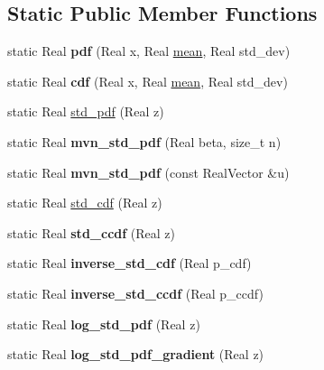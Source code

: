 \subsection*{Static Public Member Functions}
\begin{DoxyCompactItemize}
\item 
static Real {\bfseries pdf} (Real x, Real \hyperlink{classPecos_1_1NormalRandomVariable_a962ffe5a3593be370d5c883365c060f4}{mean}, Real std\+\_\+dev)\label{classPecos_1_1NormalRandomVariable_a1c24d3db932d840bd8876d25445fe0d2}

\item 
static Real {\bfseries cdf} (Real x, Real \hyperlink{classPecos_1_1NormalRandomVariable_a962ffe5a3593be370d5c883365c060f4}{mean}, Real std\+\_\+dev)\label{classPecos_1_1NormalRandomVariable_a997b966ecf3b793457430273db5079e3}

\item 
static Real \hyperlink{classPecos_1_1NormalRandomVariable_a1723ee7569b2b6dd6413dc9ffc0382b6}{std\+\_\+pdf} (Real z)
\item 
static Real {\bfseries mvn\+\_\+std\+\_\+pdf} (Real beta, size\+\_\+t n)\label{classPecos_1_1NormalRandomVariable_aa8b5e5701c2456b953f1c386d36e07fe}

\item 
static Real {\bfseries mvn\+\_\+std\+\_\+pdf} (const Real\+Vector \&u)\label{classPecos_1_1NormalRandomVariable_a12503add3b2cec672b8c9b50c13bf4cc}

\item 
static Real \hyperlink{classPecos_1_1NormalRandomVariable_a62b98da8336394c9e30ea9fd5e79b2e5}{std\+\_\+cdf} (Real z)
\item 
static Real {\bfseries std\+\_\+ccdf} (Real z)\label{classPecos_1_1NormalRandomVariable_aa02b173cdbee0e135e5501acc7edd639}

\item 
static Real {\bfseries inverse\+\_\+std\+\_\+cdf} (Real p\+\_\+cdf)\label{classPecos_1_1NormalRandomVariable_ad0d24d0f74c6ff422ffb64f8204e5c04}

\item 
static Real {\bfseries inverse\+\_\+std\+\_\+ccdf} (Real p\+\_\+ccdf)\label{classPecos_1_1NormalRandomVariable_ab1e233a604518e682cf7d179d3d2879a}

\item 
static Real {\bfseries log\+\_\+std\+\_\+pdf} (Real z)\label{classPecos_1_1NormalRandomVariable_a9672626f0688946d80b65a8fd041aa03}

\item 
static Real {\bfseries log\+\_\+std\+\_\+pdf\+\_\+gradient} (Real z)\label{classPecos_1_1NormalRandomVariable_a3c21a78586ff3c5eacf54ab89926f0c6}


\end{DoxyCompactItemize}
